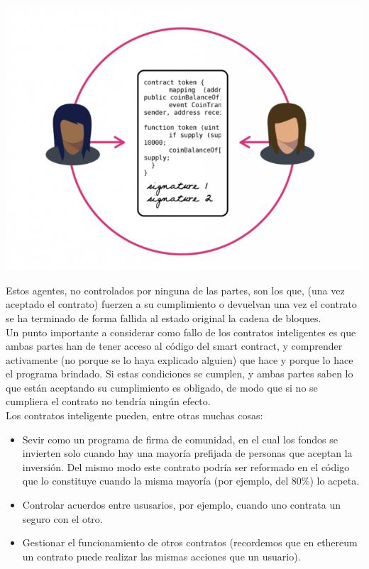 \documentclass[11pt,a4paper]{article}
\begin{document}
\begin{center}
  
  \includegraphics[scale=.45]{images/smart.png}
\end{center}

Estos agentes, no controlados por ninguna de las partes, son los que, (una vez aceptado el contrato) fuerzen a su cumplimiento o devuelvan una vez el contrato se ha terminado de forma fallida al estado original la cadena de bloques.\\


Un punto importante a considerar como fallo de los contratos inteligentes es que ambas partes han de tener acceso al código del smart contract, y comprender activamente (no porque se lo haya explicado alguien) que hace y porque lo hace el programa brindado. Si estas condiciones se cumplen, y ambas partes saben lo que están aceptando su cumplimiento es obligado, de modo que si no se cumpliera el contrato no tendría ningún efecto.\\

Los contratos inteligente pueden, entre otras muchas cosas:
\begin{itemize}
\item Sevir como un programa de firma de comunidad, en el cual los fondos se invierten solo cuando hay una mayoría prefijada de personas que aceptan la inversión. Del mismo modo este contrato podría ser reformado en el código que lo constituye cuando la misma mayoría (por ejemplo, del 80\%) lo acpeta.
\item Controlar acuerdos entre ususarios, por ejemplo, cuando uno contrata un seguro con el otro.
\item Gestionar el funcionamiento de otros contratos (recordemos que en ethereum un contrato puede realizar las mismas acciones que un usuario).
\end{itemize}
\end{document}
